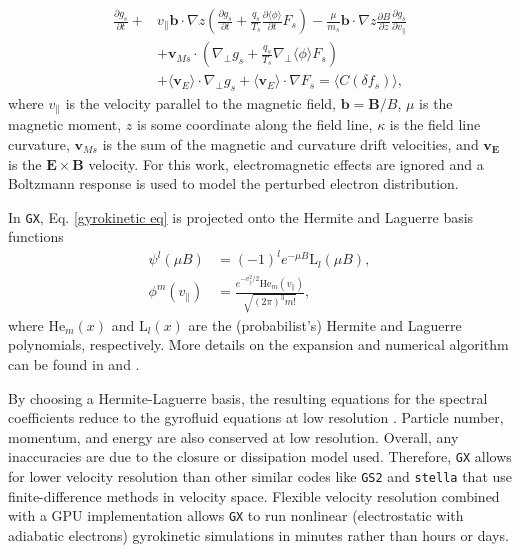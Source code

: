 \documentclass{jpp}
\begin{document}
\begin{align}\label{gyrokinetic eq}
   \frac{\partial g_s}{\partial t} + & v_{\parallel} \mathbf{b} \cdot \nabla z \left(\frac{\partial g_s}{\partial t} + \frac{q_s}{T_s}\frac{\partial \langle \phi \rangle}{\partial t} F_s\right) - \frac{\mu}{m_s} \mathbf{b}\cdot \nabla z \frac{\partial B}{\partial z}\frac{\partial g_s}{\partial v_{\parallel}} \\
   &+ \mathbf{v}_{Ms} \cdot \left(\nabla_{\perp} g_s + \frac{q_s}{T_s} \nabla_{\perp} \langle \phi \rangle F_s\right)\\
   &+ \langle \mathbf{v}_E \rangle \cdot \nabla_{\perp} g_s + \langle \mathbf{v}_E \rangle \cdot \nabla F_s = \langle C\left(\delta f_s\right)\rangle,
\end{align}
where $v_{\parallel}$ is the velocity parallel to the magnetic field, $\mathbf{b} = \mathbf{B}/B$, $\mu$ is the magnetic moment, $z$ is some coordinate along the field line, $\kappa$ is the field line curvature, $\mathbf{v}_{Ms}$ is the sum of the magnetic and curvature drift velocities, and $\mathbf{v_E}$ is the $\mathbf{E} \times \mathbf{B}$ velocity. For this work, electromagnetic effects are ignored and a Boltzmann response is used to model the perturbed electron distribution.

In {\tt GX}, Eq. \eqref{gyrokinetic eq} is projected onto the Hermite and Laguerre basis functions
\begin{align}
    \psi^l(\mu B) &= (-1)^l e^{-\mu B} \mathrm{L}_l(\mu B), \\
    \phi^m(v_{\parallel}) &= \frac{e^{-v_{\parallel}^2/2}\mathrm{He}_m(v_{\parallel})}{\sqrt{(2 \pi)^3 m!}},
\end{align}
where $\mathrm{He}_m(x)$ and $\mathrm{L}_l(x)$ are the (probabilist's) Hermite and Laguerre polynomials, respectively. More details on the expansion and numerical algorithm can be found in \citet{Mandell2018Laguerre-HermiteGyrokinetics} and \citet{Mandell2022GX:Design}.

By choosing a Hermite-Laguerre basis, the resulting equations for the spectral coefficients reduce to the gyrofluid equations at low resolution \citep{Dorland1993GyrofluidEffects,Beer1995GyrofluidTokamaks}. Particle number, momentum, and energy are also conserved at low resolution. Overall, any inaccuracies are due to the closure or dissipation model used. Therefore, {\tt GX} allows for lower velocity resolution than other similar codes like {\tt GS2} \citep{Kotschenreuther1995ComparisonInstabilities,Dorland2000ElectronTurbulence} and {\tt stella} \citep{Barnes2019Stella:Configurations} that use finite-difference methods in velocity space.  Flexible velocity resolution combined with a GPU implementation allows {\tt GX} to run nonlinear (electrostatic with adiabatic electrons) gyrokinetic simulations in minutes rather than hours or days.
\end{document}
